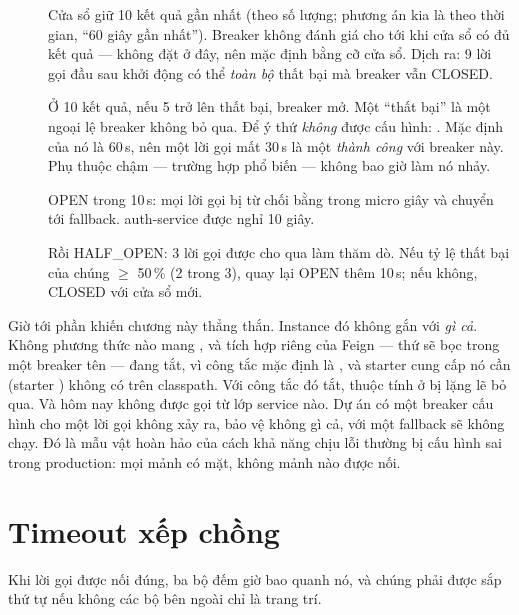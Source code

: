 \begin{description}
  \item[] Cửa sổ giữ 10 kết quả gần nhất (theo số lượng; phương
  án kia là theo thời gian, ``60 giây gần nhất''). Breaker không đánh
  giá cho tới khi cửa sổ có đủ  kết quả
  --- không đặt ở đây, nên mặc định bằng cỡ cửa sổ. Dịch ra: 9 lời gọi
  đầu sau khởi động có thể \emph{toàn bộ} thất bại mà breaker vẫn
  CLOSED.
  \item[] Ở 10 kết quả, nếu 5 trở lên thất bại, breaker mở. Một
  ``thất bại'' là một ngoại lệ breaker không bỏ qua. Để ý thứ
  \emph{không} được cấu hình: . Mặc
  định của nó là 60\,s, nên một lời gọi mất 30\,s là một \emph{thành
  công} với breaker này. Phụ thuộc chậm --- trường hợp phổ biến ---
  không bao giờ làm nó nhảy.
  \item[] OPEN trong 10\,s: mọi lời gọi bị từ chối bằng
   trong micro giây và chuyển tới
  fallback. auth-service được nghỉ 10 giây.
  \item[] Rồi HALF\_OPEN: 3 lời gọi được cho qua làm thăm dò. Nếu
  tỷ lệ thất bại của chúng $\ge$ 50\,\% (2 trong 3), quay lại OPEN thêm
  10\,s; nếu không, CLOSED với cửa sổ mới.
\end{description}

Giờ tới phần khiến chương này thẳng thắn. Instance 
đó không gắn với \emph{gì cả}. Không phương thức nào mang
, và tích hợp riêng của
Feign --- thứ sẽ bọc  trong một breaker tên
 --- đang tắt, vì công tắc
 mặc định là , và
starter cung cấp  nó cần (starter
) không có trên classpath. Với công
tắc đó tắt, thuộc tính  ở  bị lặng lẽ bỏ qua. Và
 hôm nay không được gọi từ lớp service nào. Dự
án có một breaker cấu hình cho một lời gọi không xảy ra, bảo vệ không
gì cả, với một fallback sẽ không chạy. Đó là mẫu vật hoàn hảo của cách
khả năng chịu lỗi thường bị cấu hình sai trong production: mọi mảnh có
mặt, không mảnh nào được nối.

\section{Timeout xếp chồng}

Khi lời gọi được nối đúng, ba bộ đếm giờ bao quanh nó, và chúng phải
được sắp thứ tự nếu không các bộ bên ngoài chỉ là trang trí.

